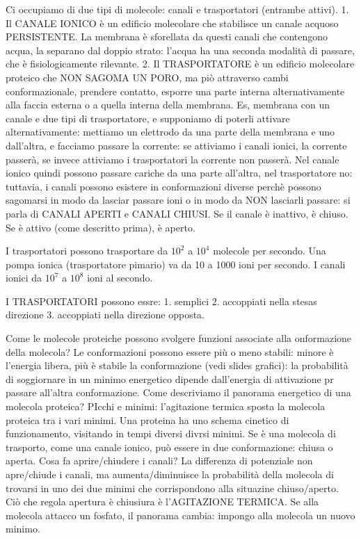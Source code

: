 \documentclass[a4paper,12pt]{article}
\begin{document}
Ci occupiamo di due tipi di molecole: canali e trasportatori (entrambe attivi).
1. Il CANALE IONICO è un edificio molecolare che stabilisce un canale acquoso PERSISTENTE. La membrana è sforellata da questi canali che contengono acqua, la separano dal doppio strato: l'acqua ha una seconda modalità di passare, che è fisiologicamente rilevante. 
2. Il TRASPORTATORE è un edificio molecolare proteico che NON SAGOMA UN PORO, ma piò attraverso cambi conformazionale, prendere contatto, esporre una parte interna alternativamente alla faccia esterna o a quella interna della membrana.
Es, membrana con un canale e due tipi di trasportatore, e supponiamo di poterli attivare alternativamente: mettiamo un elettrodo da una parte della membrana e uno dall'altra, e facciamo passare la corrente: se attiviamo i canali ionici, la corrente passerà, se invece attiviamo i trasportatori la corrente non passerà. Nel canale ionico quindi possono passare cariche da una parte all'altra, nel trasportatore no: tuttavia, i canali possono esistere in conformazioni diverse perchè possono sagomarsi in modo da lasciar passare ioni o in modo da NON lasciarli passare: si parla di CANALI APERTI e CANALI CHIUSI. Se il canale è inattivo, è chiuso. Se è attivo (come descritto prima), è aperto.

I trasportatori possono trasportare da $10^{2}$ a $10^{4}$ molecole per secondo.
Una pompa ionica  (trasportatore pimario) va da 10 a 1000 ioni per secondo.
I canali ionici da $10^{7}$ a $10^{8}$ ioni al secondo.

I TRASPORTATORI possono essre:
1. semplici
2. accoppiati nella stesas direzione
3. accoppiati nella direzione opposta.

Come le molecole proteiche possono svolgere funzioni associate alla onformazione della molecola?
Le conformazioni possono essere più o meno stabili: minore è l'energia libera, più è stabile la conformazione (vedi slides grafici): la probabilità di soggiornare in un minimo energetico dipende dall'energia di attivazione pr passare all'altra conformazione.
Come descriviamo il panorama energetico di una molecola proteica?
PIcchi e minimi: l'agitazione termica sposta la molecola proteica tra i vari minimi. Una proteina ha uno schema cinetico di funzionamento, visitando in tempi diversi divrsi minimi. Se è una molecola di trasporto, come una canale ionico, può essere in due conformazione: chiusa o aperta. Cosa fa aprire/chiudere i canali? La differenza di potenziale non apre/chiude i  canali, ma aumenta/diminuisce la probabilità della molecola di trovarsi in uno dei due minimi che corrispondono alla situazine chiuso/aperto. Ciò che regola apertura è chiusiura è l'AGITAZIONE TERMICA. 
Se alla molecola attacco un fosfato, il panorama cambia: impongo alla molecola un nuovo minimo.
\end{document}
